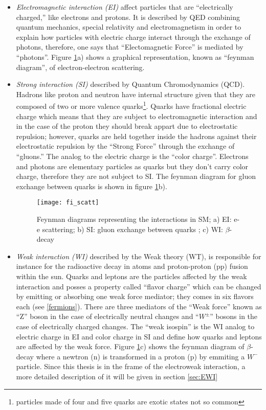 \begin{itemize}

\item \textit{Electromagnetic interaction (EI)} affect particles that are ``electrically charged,'' like electrons and protons. It is described by QED combining quantum mechanics, special relativity and electromagnetism in order to explain how particles with electric charge interact through the exchange of photons, therefore, one says that ``Electomagnetic Force'' is mediated by ``photons''. Figure \ref{fi_scatt}a)  shows a graphical representation, known as ``feynman diagram'', of electron-electron scattering.    

\item \textit{Strong interaction (SI)} described by Quantum Chromodynamics (QCD). Hadrons like proton and neutron have internal structure given that they are composed of two or more valence quarks\footnote{particles made of four and five quarks are exotic states not so common}. Quarks have fractional electric charge which means that they are subject to electromagnetic interaction and in the case of the proton they should break appart due to electrostatic repulsion; however, quarks are held together inside the hadrons against their electrostatic repulsion by the ``Strong Force'' through the exchange of ``gluons.'' The analog to the electric charge is the ``color charge''. Electrons and photons are elementary particles as quarks but they don't carry color charge, therefore they are not subject to SI. The feynman diagram for gluon exchange between quarks is shown in figure \ref{fi_scatt}b).  

\begin{figure}[h!]
\centering
    \texttt{[image: fi\_scatt]}
\caption[SM interactions diagrams]{Feynman diagrams representing the interactions in SM; a) EI: e-e scattering; b) SI: gluon exchange between quarks ; c) WI: $\beta$-decay }
\label{fi_scatt}
\end{figure}

\item \textit{Weak interaction (WI)} described by the Weak theory (WT), is responsible for instance for the radioactive decay in atoms and proton-proton (pp) fusion within the sun. Quarks and leptons are the particles affected by the weak interaction and posses a property called ``flavor charge'' which can be changed by emitting or absorbing one weak force mediator; they comes in six flavors each (see \ref{fermions}). There are three mediators of the ``Weak force'' known as ``Z'' boson in the case of electrically neutral changes and ``$W^\pm$'' bosons in the case of electrically charged changes. The ``weak isospin'' is the WI analog to electric charge in EI and color charge in SI and define how quarks and leptons are affected by the weak force. Figure \ref{fi_scatt}c) shows the feynman diagram of $\beta$-decay where a newtron (n) is transformed in a proton (p) by emmiting a $W^-$ particle. Since this thesis is in the frame of the electroweak interaction, a more detailed description of it will be given in section \ref{sec:EWI}


\end{itemize}
